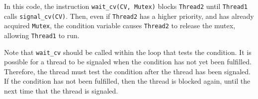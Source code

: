 In this code, the instruction \texttt{wait\_cv(CV, Mutex)} blocks \texttt{Thread2} until \texttt{Thread1} calls \texttt{signal\_cv(CV)}.  Then, even if \texttt{Thread2} has a higher priority, and has already acquired \texttt{Mutex}, the condition variable causes \texttt{Thread2} to release the mutex, allowing \texttt{Thread1} to run.  

Note that \texttt{wait\_cv} should be called within the loop that tests the condition.  It is possible for a thread to be signaled when the condition has not yet been fulfilled.  Therefore, the thread must test the condition after the thread has been signaled.  If the condition has not been fulfilled, then the thread is blocked again, until the next time that the thread is signaled.

\ignore{

}